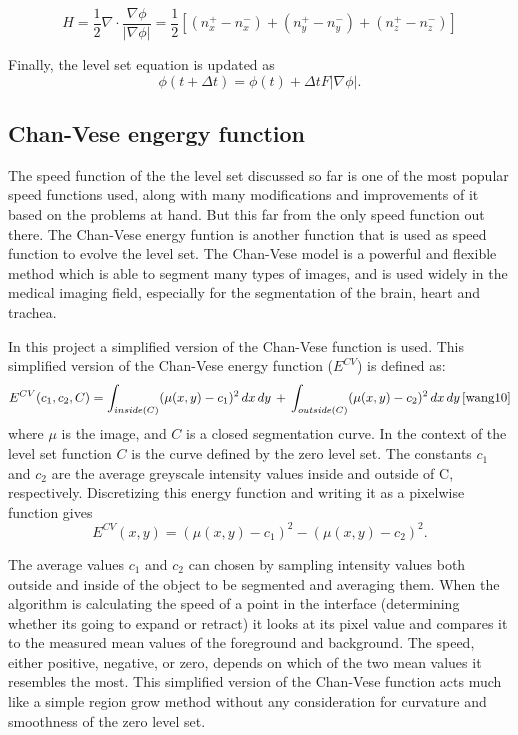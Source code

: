 \begin{equation}
H = \frac{1}{2}\nabla \cdot \frac{\nabla \phi}{|\nabla \phi|} = \frac{1}{2}[(n_x^+ - n_x^-) + (n_y^+ - n_y^-) + (n_z^+ - n_z^-)]
\label{meanCurvature}
\end{equation}

Finally, the level set equation is updated as
\begin{equation}
\phi(t + \Delta t) = \phi(t) + \Delta tF|\nabla \phi|.
\end{equation}

\subsection{Chan-Vese engergy function}
The speed function of the the level set discussed so far is one of the most popular speed functions used, along with many modifications and improvements of it based on the problems at hand. But this far from the only speed function out there. The Chan-Vese energy funtion is another function that is used as speed function to evolve the level set. The Chan-Vese model is a powerful and flexible method which is able to segment many types of images, and is used widely in the medical imaging field, especially for the segmentation of the brain, heart and trachea.

In this project a simplified version of the Chan-Vese function is used. This simplified version of the Chan-Vese energy function ($E^{CV}$) is defined as: 
\begin{equation}
E^{CV}(c_1,c_2,C) = \int_{inside(C)} (\mu (x,y) - c_1)^2 \, dx \, dy \, + \, \int_{outside(C)} (\mu (x,y) - c_2)^2 \, dx \, dy \, \cite{wang10} %
\end{equation}
where $\mu$ is the image, and $C$ is a closed segmentation curve. In the context of the level set function $C$ is the curve defined by the zero level set. The constants $c_1$ and $c_2$ are the average greyscale intensity values inside and outside of C, respectively. Discretizing this energy function and writing it as a pixelwise function gives
\begin{equation}
E^{CV}(x,y) = (\mu (x,y) - c_1)^2 - (\mu (x,y) - c_2)^2.
\end{equation}

The average values $c_1$ and $c_2$ can chosen by sampling intensity values both outside and inside of the object to be segmented and averaging them. When the algorithm is calculating the speed of a point in the interface (determining whether its going to expand or retract) it looks at its pixel value and compares it to the measured mean values of the foreground and background. The speed, either positive, negative, or zero, depends on which of the two mean values it resembles the most. This simplified version of the Chan-Vese function acts much like a simple region grow method without any consideration for curvature and smoothness of the zero level set.